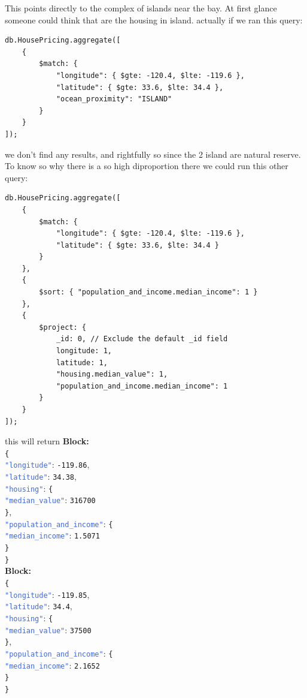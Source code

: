 \documentclass{Configuration_Files/PoliMi3i_thesis}
\newcommand{\jsonkey}[1]{\textcolor{RoyalBlue}{\texttt{"#1"}}}
\newcommand{\jsonnumber}[1]{\textcolor{BrickRed}{\texttt{#1}}}
\begin{document}
This points directly to the complex of islands near the bay. At first glance someone could think that are the housing in island. actually if we ran this query:
\begin{lstlisting}[language=MongoDB]
db.HousePricing.aggregate([
    {
        $match: {
            "longitude": { $gte: -120.4, $lte: -119.6 },
            "latitude": { $gte: 33.6, $lte: 34.4 },
            "ocean_proximity": "ISLAND" 
        }
    }
]);
\end{lstlisting}
we don't find any results, and rightfully so since the 2 island are natural reserve. To know so why there is a so  high diproportion there we could run this other query: 

\begin{lstlisting}[language=MongoDB]
db.HousePricing.aggregate([
    {
        $match: {
            "longitude": { $gte: -120.4, $lte: -119.6 },
            "latitude": { $gte: 33.6, $lte: 34.4 }
        }
    },
    {
        $sort: { "population_and_income.median_income": 1 } 
    },
    {
        $project: {
            _id: 0, // Exclude the default _id field
            longitude: 1,
            latitude: 1,
            "housing.median_value": 1,
            "population_and_income.median_income": 1
        }
    }
]);
\end{lstlisting}
this will return 
\textbf{Block:}\\
\noindent
\texttt{\{} \\
\jsonkey{longitude}: \jsonnumber{-119.86}, \\
\jsonkey{latitude}: \jsonnumber{34.38}, \\
\jsonkey{housing}: \texttt{\{} \\
\hspace*{1em} \jsonkey{median\_value}: \jsonnumber{316700} \\
\texttt{\}}, \\
\jsonkey{population\_and\_income}: \texttt{\{} \\
\hspace*{1em} \jsonkey{median\_income}: \jsonnumber{1.5071} \\
\texttt{\}} \\
\texttt{\}} \\

\textbf{Block:}\\
\noindent
\texttt{\{} \\
\jsonkey{longitude}: \jsonnumber{-119.85}, \\
\jsonkey{latitude}: \jsonnumber{34.4}, \\
\jsonkey{housing}: \texttt{\{} \\
\hspace*{1em} \jsonkey{median\_value}: \jsonnumber{37500} \\
\texttt{\}}, \\
\jsonkey{population\_and\_income}: \texttt{\{} \\
\hspace*{1em} \jsonkey{median\_income}: \jsonnumber{2.1652} \\
\texttt{\}} \\
\texttt{\}} \\
\end{document}
